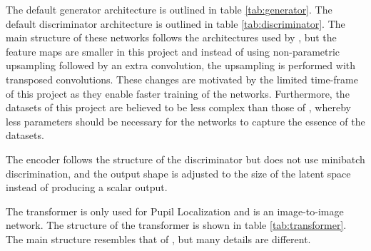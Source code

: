 The default generator architecture is outlined in table \ref{tab:generator}. The default discriminator architecture is outlined in table \ref{tab:discriminator}. The main structure of these networks follows the architectures used by \textcite{karras2017progressive}, but the feature maps are smaller in this project and instead of using non-parametric upsampling followed by an extra convolution, the upsampling is performed with transposed convolutions. These changes are motivated by the limited time-frame of this project as they enable faster training of the networks. Furthermore, the datasets of this project are believed to be less complex than those of \textcite{karras2017progressive}, whereby less parameters should be necessary for the networks to capture the essence of the datasets.

The encoder follows the structure of the discriminator but does not use minibatch discrimination, and the output shape is adjusted to the size of the latent space instead of producing a scalar output. 

The transformer is only used for Pupil Localization and is an image-to-image network. The structure of the transformer is shown in table \ref{tab:transformer}. The main structure resembles that of \textcite{ronneberger2015u}, but many details are different. 


